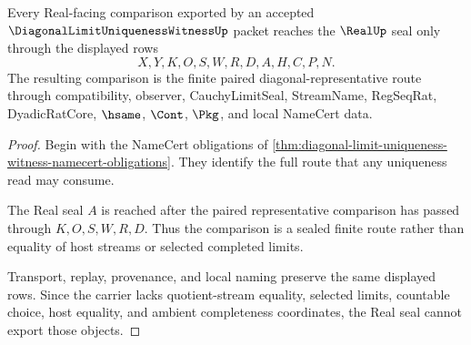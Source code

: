 \begin{theorem}
\label{thm:diagonal-limit-uniqueness-witness-real-seal}
Every Real-facing comparison exported by an accepted $\DiagonalLimitUniquenessWitnessUp$ packet reaches the $\RealUp$ seal only through the displayed rows
$$
X,Y,K,O,S,W,R,D,A,H,C,P,N .
$$
The resulting comparison is the finite paired diagonal-representative route through compatibility, observer, CauchyLimitSeal, StreamName, RegSeqRat, DyadicRatCore, $\hsame$, $\Cont$, $\Pkg$, and local NameCert data.
\end{theorem}
\begin{proof}
Begin with the NameCert obligations of \autoref{thm:diagonal-limit-uniqueness-witness-namecert-obligations}. They identify the full route that any uniqueness read may consume.

The Real seal $A$ is reached after the paired representative comparison has passed through $K,O,S,W,R,D$. Thus the comparison is a sealed finite route rather than equality of host streams or selected completed limits.

Transport, replay, provenance, and local naming preserve the same displayed rows. Since the carrier lacks quotient-stream equality, selected limits, countable choice, host equality, and ambient completeness coordinates, the Real seal cannot export those objects.
\end{proof}





